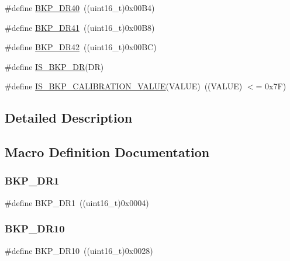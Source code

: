 \begin{DoxyCompactItemize}
\item 
\#define \mbox{\hyperlink{group___data___backup___register_ga17e0d382ac43abed1663846b5aecc09a}{B\+K\+P\+\_\+\+D\+R40}}~((uint16\+\_\+t)0x00\+B4)
\item 
\#define \mbox{\hyperlink{group___data___backup___register_gae1e184afc030987396716ddfad008e81}{B\+K\+P\+\_\+\+D\+R41}}~((uint16\+\_\+t)0x00\+B8)
\item 
\#define \mbox{\hyperlink{group___data___backup___register_ga557d35e490957616b02672005f516542}{B\+K\+P\+\_\+\+D\+R42}}~((uint16\+\_\+t)0x00\+B\+C)
\item 
\#define \mbox{\hyperlink{group___data___backup___register_gaff069cf5458ccf0a94e2f784e2d610b8}{I\+S\+\_\+\+B\+K\+P\+\_\+\+DR}}(DR)
\item 
\#define \mbox{\hyperlink{group___data___backup___register_gafc3386eaa5383b64e9d706e5fe8dc1cf}{I\+S\+\_\+\+B\+K\+P\+\_\+\+C\+A\+L\+I\+B\+R\+A\+T\+I\+O\+N\+\_\+\+V\+A\+L\+UE}}(V\+A\+L\+UE)~((V\+A\+L\+UE) $<$= 0x7\+F)
\end{DoxyCompactItemize}


\subsection{Detailed Description}


\subsection{Macro Definition Documentation}
\mbox{\label{group___data___backup___register_ga5d4c3eeaccafcfc0ee3b5dc01381bab0}} 
\subsubsection{\texorpdfstring{BKP\_DR1}{BKP\_DR1}}
{\footnotesize\ttfamily \#define B\+K\+P\+\_\+\+D\+R1~((uint16\+\_\+t)0x0004)}

\mbox{\label{group___data___backup___register_ga82bb6da0b7a29a737b2d2b03c0561260}} 
\subsubsection{\texorpdfstring{BKP\_DR10}{BKP\_DR10}}
{\footnotesize\ttfamily \#define B\+K\+P\+\_\+\+D\+R10~((uint16\+\_\+t)0x0028)}

